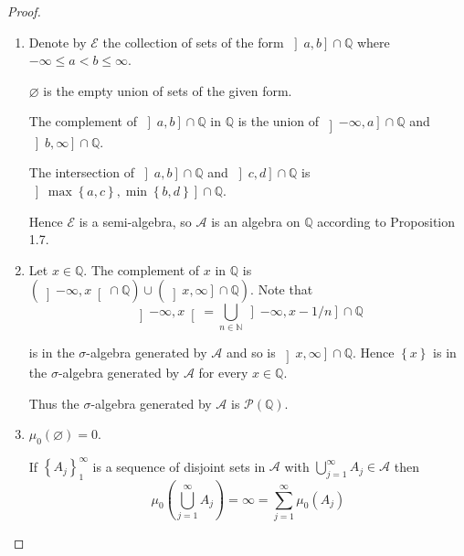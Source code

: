 \begin{proof}
    \begin{enumerate}[itemsep=0pt,label=\textbf{\alph*.}]
        \item Denote by \( \mathcal{E} \) the collection of sets of the form \( \left\rbrack a, b \right\rbrack \cap \mathbb{Q} \) where \( -\infty \le a < b \le \infty \).

              \( \varnothing \) is the empty union of sets of the given form.

              The complement of \( \left\rbrack a, b \right\rbrack \cap \mathbb{Q} \) in \( \mathbb{Q} \) is the union of \( \left\rbrack -\infty, a \right\rbrack \cap \mathbb{Q} \) and \( \left\rbrack b, \infty \right\rbrack \cap \mathbb{Q} \).

              The intersection of \( \left\rbrack a, b \right\rbrack \cap \mathbb{Q} \) and \( \left\rbrack c, d \right\rbrack \cap \mathbb{Q} \) is \( \left\rbrack \max\left\{ a, c \right\}, \min\left\{ b, d \right\} \right\rbrack \cap \mathbb{Q} \).

              Hence \( \mathcal{E} \) is a semi-algebra, so \( \mathcal{A} \) is an algebra on \( \mathbb{Q} \) according to Proposition 1.7.
        \item Let \( x \in \mathbb{Q} \). The complement of \( x \) in \( \mathbb{Q} \) is \( (\left\rbrack -\infty, x \right\lbrack \cap \mathbb{Q}) \cup (\left\rbrack x, \infty \right\rbrack \cap \mathbb{Q}) \). Note that
              \[
                  \left\rbrack -\infty, x \right\lbrack = \bigcup_{n \in \mathbb{N}} \left\rbrack -\infty, x - 1/n \right\rbrack \cap \mathbb{Q}
              \]

              is in the \( \sigma \)-algebra generated by \( \mathcal{A} \) and so is \( \left\rbrack x, \infty \right\rbrack \cap \mathbb{Q} \). Hence \( \left\{ x \right\} \) is in the \( \sigma \)-algebra generated by \( \mathcal{A} \) for every \( x \in \mathbb{Q} \).

              Thus the \( \sigma \)-algebra generated by \( \mathcal{A} \) is \( \mathcal{P}(\mathbb{Q}) \).
        \item \( \mu_{0}(\varnothing) = 0 \).

              If \( {\left\{ A_{j} \right\}}_{1}^{\infty} \) is a sequence of disjoint sets in \( \mathcal{A} \) with \( \bigcup_{j=1}^{\infty} A_{j} \in \mathcal{A} \) then
              \[
                  \mu_{0}\left( \bigcup_{j=1}^{\infty} A_{j} \right) = \infty = \sum_{j=1}^{\infty} \mu_{0}(A_{j})
              \]


\end{enumerate}
\end{proof}
